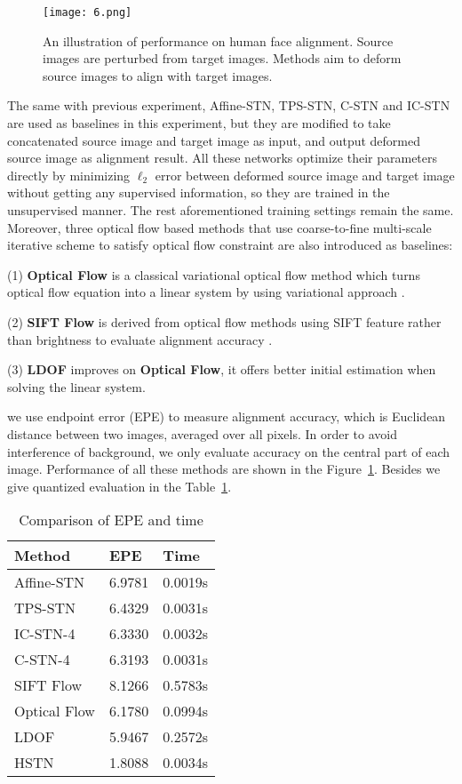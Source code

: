 \documentclass{article}
\begin{document}
\begin{figure}[t]
    \centering
    \texttt{[image: 6.png]}
    \caption{\label{fig:7} An illustration of performance on human face alignment. Source images are perturbed from target images. Methods aim to deform source images to align with target images.}
\end{figure}

The same with previous experiment, Affine-STN, TPS-STN, C-STN and IC-STN are used as baselines in this experiment, but they are modified to take concatenated source image and target image as input, and output deformed source image as alignment result.
All these networks optimize their parameters directly by minimizing ${\ell _2}$ error between deformed source image and target image without getting any supervised information, so they are trained in the unsupervised manner.
The rest aforementioned training settings remain the same.
Moreover, three optical flow based methods that use coarse-to-fine multi-scale iterative scheme to satisfy optical flow constraint are also introduced as baselines:

(1) \textbf{Optical Flow} is a classical variational optical flow method which turns optical flow equation into a linear system by using variational approach \cite{opticflow}.

(2) \textbf{SIFT Flow} is derived from optical flow methods using SIFT feature rather than brightness to evaluate alignment accuracy \cite{siftflow}.

(3) \textbf{LDOF} improves on \textbf{Optical Flow}, it offers better initial estimation when solving the linear system.

we use endpoint error (EPE) to measure alignment accuracy, which is Euclidean distance between two images, averaged over all pixels.
In order to avoid interference of background, we only evaluate accuracy on the central part of each image.
Performance of all these methods are shown in the Figure~\ref{fig:7}.
Besides we give quantized evaluation in the Table~\ref{tab:2}.

\begin{table}[t]
  \centering
  \caption{Comparison of EPE and time}
    \begin{tabular}{p{2.5cm}<{\centering}|p{2.5cm}<{\centering}|p{2.5cm}<{\centering}}
    \hline
    Method & EPE & Time \\
    \hline
    Affine-STN   & 6.9781  & 0.0019s \\
    TPS-STN      & 6.4329  & 0.0031s \\
    IC-STN-4     & 6.3330  & 0.0032s \\
    C-STN-4      & 6.3193  & 0.0031s \\
    SIFT Flow    & 8.1266  & 0.5783s \\
    Optical Flow & 6.1780  & 0.0994s \\
    LDOF         & 5.9467  & 0.2572s \\
    \hline
    HSTN          & 1.8088  & 0.0034s \\
    \hline
    \end{tabular}%
  \label{tab:2}%
\end{table}%
\end{document}
